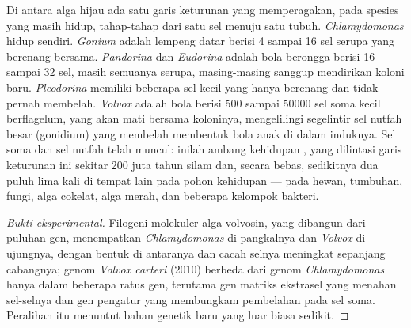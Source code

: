 \begin{proposition}\label{prop:b2:unicellular-diversity:volvox}
Di antara alga hijau ada satu garis keturunan yang memperagakan, pada
spesies yang masih hidup, tahap-tahap dari satu sel menuju satu tubuh.
\emph{Chlamydomonas} hidup sendiri. \emph{Gonium} adalah lempeng datar
berisi 4 sampai 16 sel serupa yang berenang bersama. \emph{Pandorina}
dan \emph{Eudorina} adalah bola berongga berisi 16 sampai 32 sel, masih
semuanya serupa, masing-masing sanggup mendirikan koloni baru.
\emph{Pleodorina} memiliki beberapa sel kecil yang hanya berenang dan
tidak pernah membelah. \emph{Volvox} adalah bola berisi \num{500}
sampai \num{50000} sel soma kecil berflagelum, yang akan mati bersama
koloninya, mengelilingi segelintir sel nutfah besar (gonidium) yang
membelah membentuk bola anak di dalam induknya. Sel soma dan sel nutfah
telah muncul: inilah ambang kehidupan , yang dilintasi
garis keturunan ini sekitar \num{200} juta tahun silam dan, secara
bebas, sedikitnya dua puluh lima kali di tempat lain pada pohon
kehidupan --- pada hewan, tumbuhan, fungi, alga cokelat, alga merah,
dan beberapa kelompok bakteri.
\end{proposition}
\begin{proof}[Bukti eksperimental]
Filogeni molekuler alga volvosin, yang dibangun dari puluhan gen,
menempatkan \emph{Chlamydomonas} di pangkalnya dan \emph{Volvox} di
ujungnya, dengan bentuk  di antaranya dan cacah selnya
meningkat sepanjang cabangnya; genom \emph{Volvox carteri} (2010)
berbeda dari genom \emph{Chlamydomonas} hanya dalam beberapa ratus gen,
terutama gen matriks ekstrasel yang menahan sel-selnya dan gen pengatur
yang membungkam pembelahan pada sel soma. Peralihan itu menuntut bahan
genetik baru yang luar biasa sedikit.
\end{proof}

